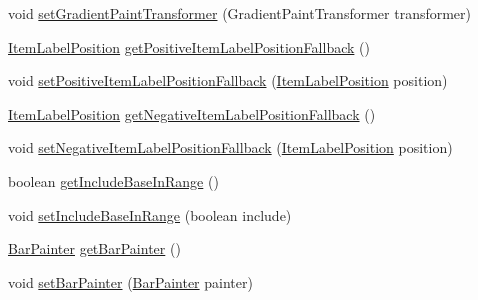\begin{DoxyCompactItemize}
\item 
void \mbox{\hyperlink{classorg_1_1jfree_1_1chart_1_1renderer_1_1category_1_1_bar_renderer_a002489c071cec14df64cb013f3548444}{set\+Gradient\+Paint\+Transformer}} (Gradient\+Paint\+Transformer transformer)
\item 
\mbox{\hyperlink{classorg_1_1jfree_1_1chart_1_1labels_1_1_item_label_position}{Item\+Label\+Position}} \mbox{\hyperlink{classorg_1_1jfree_1_1chart_1_1renderer_1_1category_1_1_bar_renderer_ab0ba3e927e89df53d9585f80b2a67222}{get\+Positive\+Item\+Label\+Position\+Fallback}} ()
\item 
void \mbox{\hyperlink{classorg_1_1jfree_1_1chart_1_1renderer_1_1category_1_1_bar_renderer_a2e03b899d718a6329c5ca2096704c937}{set\+Positive\+Item\+Label\+Position\+Fallback}} (\mbox{\hyperlink{classorg_1_1jfree_1_1chart_1_1labels_1_1_item_label_position}{Item\+Label\+Position}} position)
\item 
\mbox{\hyperlink{classorg_1_1jfree_1_1chart_1_1labels_1_1_item_label_position}{Item\+Label\+Position}} \mbox{\hyperlink{classorg_1_1jfree_1_1chart_1_1renderer_1_1category_1_1_bar_renderer_a469ad73ef3d9788fc935bb3df23e3f19}{get\+Negative\+Item\+Label\+Position\+Fallback}} ()
\item 
void \mbox{\hyperlink{classorg_1_1jfree_1_1chart_1_1renderer_1_1category_1_1_bar_renderer_a20b8984062c72c1200530d221c2925f9}{set\+Negative\+Item\+Label\+Position\+Fallback}} (\mbox{\hyperlink{classorg_1_1jfree_1_1chart_1_1labels_1_1_item_label_position}{Item\+Label\+Position}} position)
\item 
boolean \mbox{\hyperlink{classorg_1_1jfree_1_1chart_1_1renderer_1_1category_1_1_bar_renderer_a2a651216a3c24be67f109d7bb02c3a7c}{get\+Include\+Base\+In\+Range}} ()
\item 
void \mbox{\hyperlink{classorg_1_1jfree_1_1chart_1_1renderer_1_1category_1_1_bar_renderer_a98fdf75331a25f3c7a2197a3b1d0a055}{set\+Include\+Base\+In\+Range}} (boolean include)
\item 
\mbox{\hyperlink{interfaceorg_1_1jfree_1_1chart_1_1renderer_1_1category_1_1_bar_painter}{Bar\+Painter}} \mbox{\hyperlink{classorg_1_1jfree_1_1chart_1_1renderer_1_1category_1_1_bar_renderer_ae011f2b42d968c51c3928b7c3d2a9267}{get\+Bar\+Painter}} ()
\item 
void \mbox{\hyperlink{classorg_1_1jfree_1_1chart_1_1renderer_1_1category_1_1_bar_renderer_a7078d6a2ff8aebd78b2be65c4d9a8491}{set\+Bar\+Painter}} (\mbox{\hyperlink{interfaceorg_1_1jfree_1_1chart_1_1renderer_1_1category_1_1_bar_painter}{Bar\+Painter}} painter)
\item 

\end{DoxyCompactItemize}
